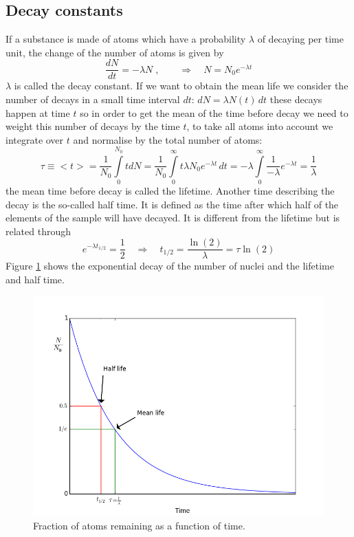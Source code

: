 \documentclass[12pt]{article}
\begin{document}
\subsection{Decay constants}
If a substance is made of atoms which have a probability $\lambda$ of decaying per time unit, the change of the number of atoms is given by
\[\frac{dN}{dt}=-\lambda N\;,\qquad\Rightarrow \quad N=N_0 e^{-\lambda t}\]
$\lambda$ is called the decay constant. If we want to obtain the mean life we consider the number of decays in a small time interval $dt$: $dN=\lambda N(t)\,dt$ these decays happen at time $t$ so in order to get the mean of the time before decay we need to weight this number of decays by the time $t$, to take all atoms into account we integrate over $t$ and normalise by the total number of atoms:
\[\tau\equiv<t>=\frac{1}{N_0}\int\limits_{0}^{N_0} t dN =\frac{1}{N_0}\int\limits_0^\infty t \lambda N_0 e^{-\lambda t}\,dt=-\lambda\int\limits_0^\infty\frac{1}{-\lambda}e^{-\lambda t}=\frac{1}{\lambda}\]
the mean time before decay is called the lifetime. Another time describing the decay is the so-called half time. It is defined as the time after which half of the elements of the sample will have decayed. It is different from the lifetime but is related through
\[e^{-\lambda t_{1/2}}=\frac12 \quad\Rightarrow \quad t_{1/2}=\frac{\ln(2)}{\lambda}=\tau \ln(2)\]
Figure \ref{fig:decayConstant} shows the exponential decay of the number of nuclei and the lifetime and half time.
\begin{figure}
\begin{center}
\includegraphics[scale=0.5]{images/decayConstant.png}
\caption{Fraction of atoms remaining as a function of time.}\label{fig:decayConstant}
\end{center}
\end{figure}
\end{document}
